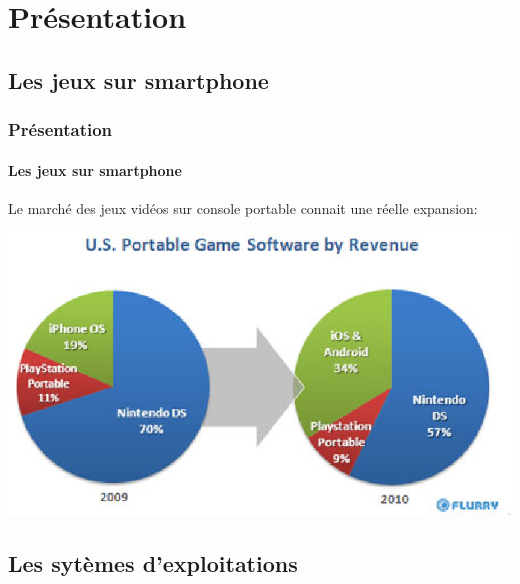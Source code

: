 \section{Présentation}

\subsection{Les jeux sur smartphone}

\begin{frame}
\frametitle{Présentation}
\framesubtitle{Les jeux sur smartphone}
Le marché des jeux vidéos sur console portable connait une réelle expansion: \\ 
\begin{center} \includegraphics[scale=0.5]{img/marche_console_portable.png} \end{center}

\end{frame}


\subsection{Les sytèmes d'exploitations}


